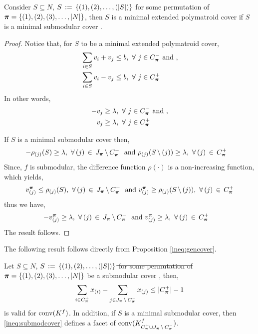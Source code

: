 \documentclass[10pt,twoside]{amsart}
\begin{document}
\begin{prop}
  Consider $S\subseteq N$, $S \,:=\, \{(1), (2), \ldots, (|S|)\}$ for some permutation of $\boldsymbol\pi = \{(1), (2), (3),\ldots, |N|\}$, then $S$ is a minimal extended polymatroid cover if $S$ is a minimal submodular cover {}.
\end{prop}
\begin{proof}
  Notice that, for $S$ to be a minimal extended polymatroid cover,
  \begin{align*}
    & \sum_{i\in S} v_i + v_j \leq b,\,\,\forall\,\,j\in C^-_{\boldsymbol\pi}  \text{   and },\\
    & \sum_{i\in S} v_i - v_j \leq b,\,\,\forall\,\,j\in C^+_{\boldsymbol\pi}
  \end{align*}
  In other words,
  \begin{align*}
     -v_j & \geq \lambda,\,\,\forall\,\,j\in C^-_{\boldsymbol\pi}  \text{   and },\\
     v_j & \geq \lambda,\,\,\forall\,\,j\in C^+_{\boldsymbol\pi}
  \end{align*}

  If $S$ is a minimal submodular cover then,
  \begin{align*}
    -\rho_{(j)}(S)  \geq \lambda,\,\,\forall\,(j) \,\in\, J_{\boldsymbol\pi}\,\backslash\, C^-_{\boldsymbol\pi}\,\,\text{ and } & \rho_{(j)}(S\,\backslash\, (j)) \geq \lambda,\,\,\forall\,(j) \,\in\, C^+_{\boldsymbol\pi}
  \end{align*}
  Since, $f$ is submodular, the difference function $\rho(\cdot)$ is a non-increasing function, which yields,
  $$
        v^{\boldsymbol\pi}_{(j)} \leq  \rho_{(j)}(S),\,\,\forall\,(j) \,\in\, J_{\boldsymbol\pi}\,\backslash\, C^-_{\boldsymbol\pi}\,\,\text{ and }  v^{\boldsymbol\pi}_{(j)} \geq \rho_{(j)}(S\,\backslash\, (j)),\,\,\forall\,(j) \,\in\, C^+_{\boldsymbol\pi}
  $$
  thus we have,
  \begin{align*}
    -v^{\boldsymbol\pi}_{(j)}  \geq \lambda,\,\,\forall\,(j) \,\in\, J_{\boldsymbol\pi}\,\backslash\, C^-_{\boldsymbol\pi}\,\,\text{ and } & v^{\boldsymbol\pi}_{(j)} \geq \lambda,\,\,\forall\,(j) \,\in\, C^+_{\boldsymbol\pi}
  \end{align*}
  The result follows.
\end{proof}

The following result follows directly from Proposition \ref{ineq:gencover}.
\begin{prop}
\label{prop:submodcover}
  Let $S\subseteq N$, \st{$S \,:=\, \{(1), (2), \ldots, (|S|)\}$ for some permutation of $\boldsymbol\pi = \{(1), (2), (3),\ldots, |N|\}$}  be a submodular cover {}, then,
  \begin{align}
    \label{ineq:submodcover}
    \sum_{i\in C^+_{\boldsymbol\pi}} x_{(i)} - \sum_{j\in J_{\boldsymbol\pi}\,\backslash\, C^-_{\boldsymbol\pi}} x_{(j)} \leq |C^+_{\boldsymbol\pi}| - 1
  \end{align}
  is valid for $\operatorname{conv}(K^f)$. In addition, if $S$ is a minimal submodular cover,
  then \eqref{ineq:submodcover} defines a facet of $\operatorname{conv}(K^f_{C^+_{\boldsymbol\pi}\cup J_{\boldsymbol\pi}\,\backslash\, C^-_{\boldsymbol\pi}})$.
\end{prop}
\end{document}
